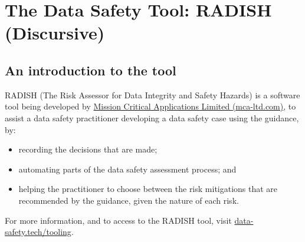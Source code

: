 %
%
\section{The Data Safety Tool: RADISH (Discursive)} \label{bkm:radish}
\cbstart
{}

\subsection{An introduction to the tool}
RADISH (The Risk Assessor for Data Integrity and Safety Hazards) is a software tool being developed by \href{https://mca-ltd.com/}{Mission Critical Applications Limited (mca-ltd.com)}, to assist a data safety practitioner developing a data safety case using the guidance, by:
\begin{itemize}
  \item recording the decisions that are made;
  \item automating parts of the data safety assessment process; and
  \item helping the practitioner to choose between the risk mitigations that are recommended by the guidance, given the nature of each risk.
\end{itemize}

For more information, and to access to the RADISH tool, visit \href{https://data-safety.tech/tooling}{data-safety.tech/tooling}.


